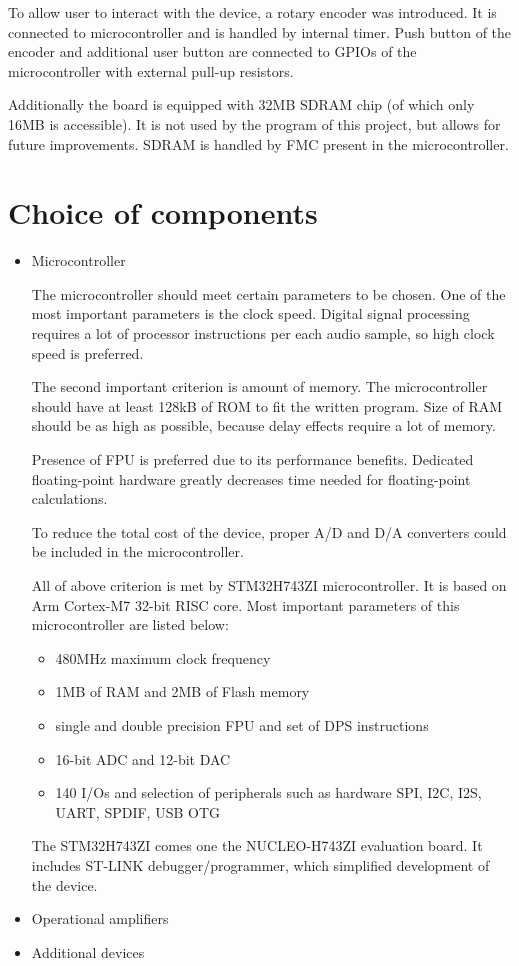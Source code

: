 \documentclass[a4paper,twoside,12pt]{book}
\begin{document}
To allow user to interact with the device, a rotary encoder was introduced.
It is connected to microcontroller and is handled by internal timer.
Push button of the encoder and additional user button are connected
to GPIOs of the microcontroller with external pull-up resistors.

Additionally the board is equipped with 32MB SDRAM chip
(of which only 16MB is accessible).
It is not used by the program of this project, but allows for future improvements.
SDRAM is handled by FMC present in the microcontroller.
\newpage

\section{Choice of components}

\begin{itemize}
    \item Microcontroller

    The microcontroller should meet certain parameters to be chosen.
    One of the most important parameters is the clock speed.
    Digital signal processing requires a lot of processor instructions
    per each audio sample, so high clock speed is preferred.

    The second important criterion is amount of memory.
    The microcontroller should have at least 128kB of ROM
    to fit the written program.
    Size of RAM should be as high as possible,
    because delay effects require a lot of memory.

    Presence of FPU is preferred due to its performance benefits.
    Dedicated floating-point hardware greatly decreases time
    needed for floating-point calculations.

    To reduce the total cost of the device,
    proper A/D and D/A converters could be included in the microcontroller.

    All of above criterion is met by STM32H743ZI microcontroller.
    It is based on Arm Cortex-M7 32-bit RISC core.
    Most important parameters of this microcontroller are listed below:
    \begin{itemize}
        \item 480MHz maximum clock frequency
        \item 1MB of RAM and 2MB of Flash memory
        \item single and double precision FPU and set of DPS instructions
        \item 16-bit ADC and 12-bit DAC
        \item 140 I/Os and selection of peripherals such as hardware
        SPI, I2C, I2S, UART, SPDIF, USB OTG
    \end{itemize}

    The STM32H743ZI comes one the NUCLEO-H743ZI evaluation board.
    It includes ST-LINK debugger/programmer,
    which simplified development of the device. 
    \item Operational amplifiers
    \item Additional devices
\end{itemize}
\end{document}
